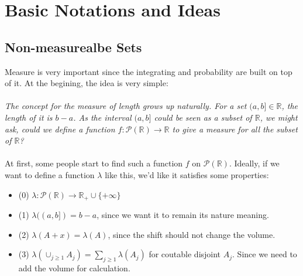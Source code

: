 \section{Basic Notations and Ideas}

\subsection{Non-measurealbe Sets}
Measure is very important since the integrating and probability are built on top of it.
At the begining, the idea is very simple:
\paragraph{}\emph{
  The concept for the measure of length grows up naturally.
  For a set $(a, b]\in \mathbb{R}$, the length of it is $b - a$.
  As the interval $(a, b]$ could be seen as a subset of $\mathbb{R}$,
  we might ask, could we define a function $f:\mathcal{P}(\mathbb{R}) \to \mathbb{R}$
  to give a measure for all the subset of $\mathbb{R}$?
} 

\paragraph{}
At first, some people start to find such a function $f$ on $\mathcal{P}(\mathbb{R})$.
Ideally, if we want to define a function $\lambda$ like this, we'd like it satisfies some properties:
\begin{itemize}[itemsep=0mm]
\item (0) $\lambda: \mathcal{P}(\mathbb{R}) \to \mathbb{R}_{+}\cup\{+\infty\}$
\item (1) $\lambda((a, b]) = b - a$, since we want it to remain its nature meaning.
\item (2) $\lambda(A + x) = \lambda(A)$, since the shift should not change the volume.
\item (3) $\lambda(\cup_{j\geq 1} A_j) = \sum_{j\geq 1} \lambda(A_j)$ for coutable  disjoint $A_j$. Since we need to add the volume for calculation.
\end{itemize}

